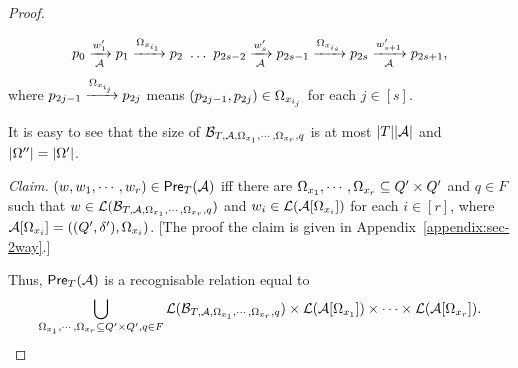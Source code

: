 \begin{proof}
\begin{itemize}
$$p_0 \xrightarrow[\mathcal{A}]{w'_1} p_1 \xrightarrow{\Omega_{x_{i_1}}} p_2\ \ldots\ p_{2s-2} \xrightarrow[\mathcal{A}]{w'_s}p_{2s-1} \xrightarrow{\Omega_{x_{i_s}}} p_{2s} \xrightarrow[\mathcal{A}]{w'_{s+1}} p_{2s+1},$$ 
where $p_{2j-1} \xrightarrow{\Omega_{x_{i_j}}} p_{2j}$ means $(p_{2j-1}, p_{2j}) \in \Omega_{x_{i_j}}$ for each $j \in [s]$.
\end{itemize}
%
%
It is easy to see that  the size of $\mathcal{B}_{T, \mathcal{A}, \Omega_{x_1}, \cdots, \Omega_{x_r}, q}$ is at most $|T||\mathcal{A}|$ and $|\Omega''| = |\Omega'|$.   

\smallskip
\noindent
\emph{Claim.} %
$(w, w_1,\cdots, w_r) \in \textsf{Pre}_{T}(\mathcal{A})$ iff there are $\Omega_{x_1}, \cdots, \Omega_{x_r} \subseteq Q' \times Q'$ and $q \in F$ such that $w \in \mathcal{L}(\mathcal{B}_{T, \mathcal{A}, \Omega_{x_1}, \cdots, \Omega_{x_r}, q})$ and $w_i \in \mathcal{L}(\mathcal{A}[\Omega_{x_i}])$ for each $i \in [r]$, where $\mathcal{A}[\Omega_{x_i}]=((Q', \delta'), \Omega_{x_i})$. [The proof the claim is given in Appendix~\ref{appendix:sec-2way}.]
\smallskip

Thus, $\textsf{Pre}_{T}(\mathcal{A})$ is a recognisable relation equal to
\[
\bigcup_{\Omega_{x_1}, \cdots, \Omega_{x_r} \subseteq Q' \times Q', q\in F} \mathcal{L}(\mathcal{B}_{T, \mathcal{A}, \Omega_{x_1}, \cdots, \Omega_{x_r},q}) \times \mathcal{L}(\mathcal{A}[\Omega_{x_1}]) \times \cdots  \times \mathcal{L}(\mathcal{A}[\Omega_{x_r}]).\]
%


\end{proof}

